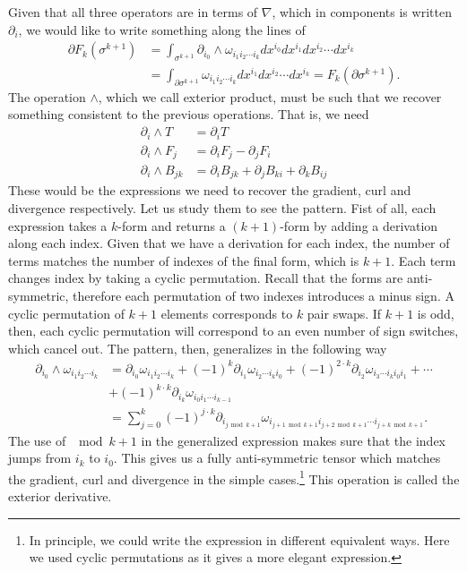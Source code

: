 Given that all three operators are in terms of $\nabla$, which in components is written $\partial_i$, we would like to write something along the lines of 
\begin{equation}\label{rp-cm-dg-generalizedStokes}
	\begin{aligned}
		\partial F_k(\sigma^{k+1}) &=\int_{\sigma^{k+1}} \partial_{i_0} \wedge \omega_{i_1 i_2 \cdots i_k} dx^{i_0} dx^{i_1} dx^{i_2} \cdots dx^{i_k} \\
		&= \int_{\partial \sigma^{k+1}} \omega_{i_1 i_2 \cdots i_k} dx^{i_1} dx^{i_2} \cdots dx^{i_k} = F_k(\partial \sigma^{k+1}).
	\end{aligned}
\end{equation}
The operation $\wedge$, which we call exterior product, must be such that we recover something consistent to the previous operations. That is, we need
\begin{equation}
	\begin{aligned}
		\partial_i \wedge T &= \partial_i T \\
		\partial_i \wedge F_j &= \partial_i F_j - \partial_j F_i \\
		\partial_i \wedge B_{jk} &= \partial_{i} B_{jk} + \partial_{j} B_{ki} + \partial_{k} B_{ij} 
	\end{aligned}
\end{equation}
These would be the expressions we need to recover the gradient, curl and divergence respectively. Let us study them to see the pattern. Fist of all, each expression takes a $k$-form and returns a $(k+1)$-form by adding a derivation along each index. Given that we have a derivation for each index, the number of terms matches the number of indexes of the final form, which is $k+1$. Each term changes index by taking a cyclic permutation. Recall that the forms are anti-symmetric, therefore each permutation of two indexes introduces a minus sign. A cyclic permutation of $k+1$ elements corresponds to $k$ pair swaps. If $k+1$ is odd, then, each cyclic permutation will correspond to an even number of sign switches, which cancel out. The pattern, then, generalizes in the following way
\begin{equation}
	\begin{aligned}
		\partial_{i_0} \wedge \omega_{i_1 i_2 \cdots i_k} &= \partial_{i_0} \omega_{i_1 i_2 \cdots i_k} + (-1)^{k} \partial_{i_1} \omega_{i_2 \cdots i_k i_0} + (-1)^{2\cdot k} \partial_{i_2} \omega_{i_3 \cdots i_k i_0 i_1} + \cdots \\
		&+ (-1)^{k\cdot k} \partial_{i_k} \omega_{i_0 i_1 \cdots i_{k-1}} \\
		&= \sum_{j=0}^{k} (-1)^{j\cdot k} \partial_{i_{j \bmod k+1}} \omega_{i_{j+1 \bmod k+1} i_{j+2 \bmod k+1} \cdots i_{j+k \bmod k+1}}.
	\end{aligned}
\end{equation}
The use of $\mod k+1$ in the generalized expression makes sure that the index jumps from $i_k$ to $i_0$. This gives us a fully anti-symmetric tensor which matches the gradient, curl and divergence in the simple cases.\footnote{In principle, we could write the expression in different equivalent ways. Here we used cyclic permutations as it gives a more elegant expression.} This operation is called the exterior derivative.

